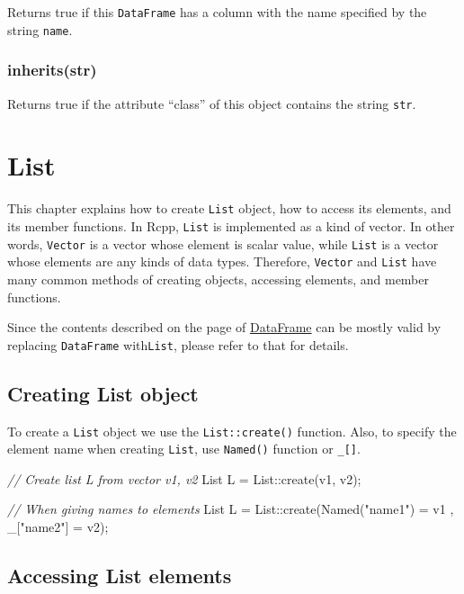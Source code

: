 \documentclass[]{book}
\newenvironment{Shaded}{\begin{snugshade}}{\end{snugshade}}
\newcommand{\StringTok}[1]{\textcolor[rgb]{0.31,0.60,0.02}{#1}}
\newcommand{\CommentTok}[1]{\textcolor[rgb]{0.56,0.35,0.01}{\textit{#1}}}
\newcommand{\NormalTok}[1]{#1}
\theoremstyle{definition}
\theoremstyle{definition}
\theoremstyle{remark}
\begin{document}
Returns true if this \texttt{DataFrame} has a column with the name
specified by the string \texttt{name}.

\subsection{inherits(str)}\label{inheritsstr}

Returns true if the attribute ``class'' of this object contains the
string \texttt{str}.

\chapter{List}\label{list}

This chapter explains how to create \texttt{List} object, how to access
its elements, and its member functions. In Rcpp, \texttt{List} is
implemented as a kind of vector. In other words, \texttt{Vector} is a
vector whose element is scalar value, while \texttt{List} is a vector
whose elements are any kinds of data types. Therefore, \texttt{Vector}
and \texttt{List} have many common methods of creating objects,
accessing elements, and member functions.

Since the contents described on the page of
\href{dataframe.md}{DataFrame} can be mostly valid by replacing
\texttt{DataFrame} with\texttt{List}, please refer to that for details.

\section{Creating List object}\label{creating-list-object}

To create a \texttt{List} object we use the \texttt{List::create()}
function. Also, to specify the element name when creating \texttt{List},
use \texttt{Named()} function or \texttt{\_{[}{]}}.

\begin{Shaded}
\begin{Highlighting}[]
\CommentTok{// Create list L from vector v1, v2}
\NormalTok{List L = List::create(v1, v2);}

\CommentTok{// When giving names to elements}
\NormalTok{List L = List::create(Named(}\StringTok{"name1"}\NormalTok{) = v1 , _[}\StringTok{"name2"}\NormalTok{] = v2);}
\end{Highlighting}
\end{Shaded}

\section{Accessing List elements}\label{accessing-list-elements}
\end{document}
